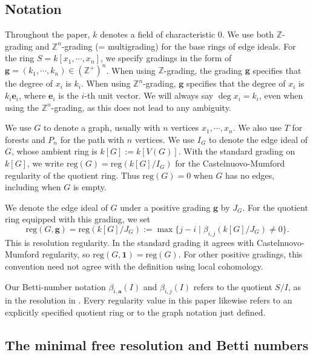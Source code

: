 \documentclass[dvipsnames,10pt]{article}
\begin{document}
\subsection{Notation}\label{notation}

Throughout the paper, $k$ denotes a field of characteristic $0$. We use both $\mathbb{Z}$-grading and $\mathbb{Z}^n$-grading (= multigrading) for the base rings of edge ideals. For the ring $S=k[x_1,\cdots,x_n]$, we specify gradings in the form of $\mathbf{g}=(k_1,\cdots,k_n)\in (\mathbb{Z}^+)^n$. When using $\mathbb{Z}$-grading, the grading $\mathbf{g}$ specifies that the degree of $x_i$ is $k_i$. When using $\mathbb{Z}^n$-grading, $\mathbf{g}$ specifies that the degree of $x_i$ is $k_i\mathbf{e}_i$, where $\mathbf{e}_i$ is the $i$-th unit vector. We will always say $\deg x_i=k_i$, even when using the $\mathbb{Z}^n$-grading, as this does not lead to any ambiguity.

We use $G$ to denote a graph, usually with $n$ vertices $x_1,\cdots,x_n$. We also use $T$ for forests and $P_n$ for the path with $n$ vertices. We use $I_G$ to denote the edge ideal of $G$, whose ambient ring is $k[G]:= k[V(G)]$. With the standard grading on $k[G]$, we write $\mathrm{reg}(G)=\mathrm{reg}(k[G]/I_G)$ for the Castelnuovo-Mumford regularity of the quotient ring. Thus $\mathrm{reg}(G)=0$ when $G$ has no edges, including when $G$ is empty.

We denote the edge ideal of $G$ under a positive grading $\mathbf{g}$ by $J_G$. For the quotient ring equipped with this grading, we set
\[
    \mathrm{reg}(G,\mathbf{g})=\mathrm{reg}(k[G]/J_G)
    :=\max\{j-i\mid\beta_{i,j}(k[G]/J_G)\neq0\}.
\]
This is resolution regularity. In the standard grading it agrees with Castelnuovo-Mumford regularity, so $\mathrm{reg}(G,\mathbf{1})=\mathrm{reg}(G)$. For other positive gradings, this convention need not agree with the definition using local cohomology.

Our Betti-number notation $\beta_{i,\mathbf{a}}(I)$ and $\beta_{i,j}(I)$ refers to the quotient $S/I$, as in the resolution in . Every regularity value in this paper likewise refers to an explicitly specified quotient ring or to the graph notation just defined.

\subsection{The minimal free resolution and Betti numbers}
\end{document}

